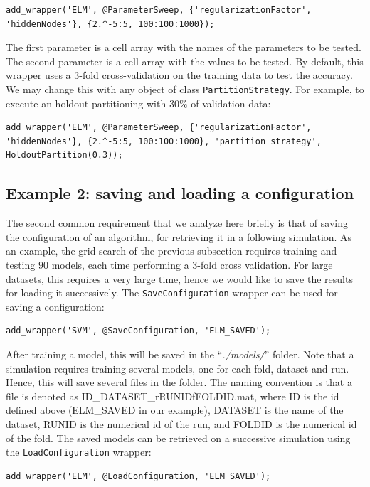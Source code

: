 \begin{lstlisting}
add_wrapper('ELM', @ParameterSweep, {'regularizationFactor', 'hiddenNodes'}, {2.^-5:5, 100:100:1000});
\end{lstlisting}

\noindent The first parameter is a cell array with the names of the parameters to be tested. The second parameter is a cell array with the values to be tested. By default, this wrapper uses a $3$-fold cross-validation on the training data to test the accuracy. We may change this with any object of class \verb|PartitionStrategy|. For example, to execute an holdout partitioning with $30\%$ of validation data:

\begin{lstlisting}
add_wrapper('ELM', @ParameterSweep, {'regularizationFactor', 'hiddenNodes'}, {2.^-5:5, 100:100:1000}, 'partition_strategy', HoldoutPartition(0.3));
\end{lstlisting}

\subsection{Example 2: saving and loading a configuration}

The second common requirement that we analyze here briefly is that of saving the configuration of an algorithm, for retrieving it in a following simulation. As an example, the grid search of the previous subsection requires training and testing $90$ models, each time performing a $3$-fold cross validation. For large datasets, this requires a very large time, hence we would like to save the results for loading it successively. The \verb|SaveConfiguration| wrapper can be used for saving a configuration:

\begin{lstlisting}
add_wrapper('SVM', @SaveConfiguration, 'ELM_SAVED');
\end{lstlisting}

\noindent After training a model, this will be saved in the ``\textit{./models/}'' folder. Note that a simulation requires training several models, one for each fold, dataset and run. Hence, this will save several files in the folder. The naming convention is that a file is denoted as ID\_DATASET\_rRUNIDfFOLDID.mat, where ID is the id defined above (ELM\_SAVED in our example), DATASET is the name of the dataset, RUNID is the numerical id of the run, and FOLDID is the numerical id of the fold. The saved models can be retrieved on a successive simulation using the \verb|LoadConfiguration| wrapper:

\begin{lstlisting}
add_wrapper('ELM', @LoadConfiguration, 'ELM_SAVED');
\end{lstlisting}